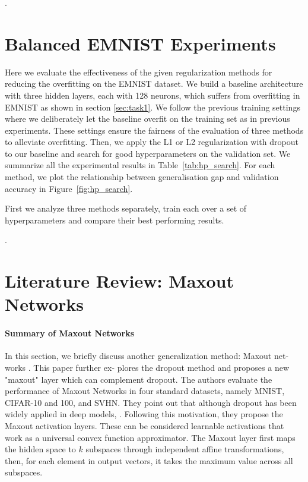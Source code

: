 \documentclass{article}
\begin{document}
\questionFourteen.



\section{Balanced EMNIST Experiments}

\questionTableThree

\questionFigureFour

\label{sec:task2.2}

Here we evaluate the effectiveness of the given regularization methods for reducing the overfitting on the EMNIST dataset.
We build a baseline architecture with three hidden layers, each with 128 neurons, which suffers from overfitting in EMNIST as shown in section \ref{sec:task1}.
We follow the previous training settings where we deliberately let the baseline overfit
on the training set as in previous experiments.
These settings ensure the fairness of the evaluation of three methods to alleviate overfitting.
Then, we apply the L1 or L2 regularization with dropout to our baseline and search for good hyperparameters on the validation set.
We summarize all
the experimental results in Table~\ref{tab:hp_search}. For each method, we
plot the relationship between generalisation gap and validation accuracy in Figure~\ref{fig:hp_search}.

First we analyze three methods separately, train each over a set of hyperparameters and compare their best performing results.

\questionFifteen.


\section{Literature Review: Maxout Networks}
\label{sec:task3}

\paragraph{Summary of Maxout Networks} In this section, we
briefly discuss another generalization method: Maxout net-
works \cite{goodfellow2013maxout}. This paper further ex-
plores the dropout method and proposes a new "maxout" layer
which can complement dropout.
The authors evaluate the performance of Maxout Networks
in four standard datasets, namely MNIST, CIFAR-10
and 100, and SVHN. They point out that although
dropout has been widely applied in deep models, \questionSixteen. Following this
motivation, they propose the Maxout activation layers. These can be considered learnable activations that work as a universal convex function approximator. The Maxout layer first
maps the hidden space to $k$ subspaces through independent
affine transformations, then, for each element in output
vectors, it takes the maximum value across all subspaces.
\end{document}
